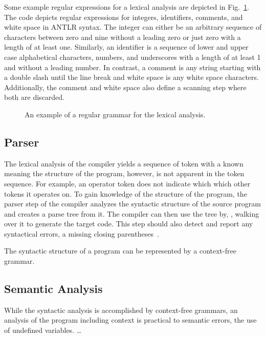 Some example regular expressions for a lexical analysis are depicted in Fig.~\ref{fig:example_lexer}. The code depicts regular expressions for integers, identifiers, comments, and white space in ANTLR syntax.
The integer can either be an arbitrary sequence of characters between zero and nine without a leading zero or just zero with a length of at least one. Similarly, an identifier is a sequence of lower and upper case alphabetical characters, numbers, and underscores with a length of at least 1 and without a leading number. In contrast, a comment is any string starting with a double slash until the line break and white space is any white space characters. Additionally, the comment and white space also define a scanning step where both are discarded.

\begin{figure}[htp]
    \centering
    
    \caption{An example of a regular grammar for the lexical analysis.}
    \label{fig:example_lexer}
\end{figure}

\subsection{Parser}
The lexical analysis of the compiler yields a sequence of token with a known meaning the structure of the program, however, is not apparent in the token sequence. For example, an operator token does not indicate which which other tokens it operates on. To gain knowledge of the structure of the program, the parser step of the compiler analyzes the syntactic structure of the source program and creates a parse tree from it. 
The compiler can then use the tree by, \eg, walking over it to generate the target code. This step should also detect and report any syntactical errors, \eg a missing closing parentheses~\cite{VSSD07}.

The syntactic structure of a program can be represented by a context-free grammar.

\subsection{Semantic Analysis}
While the syntactic analysis is accomplished by context-free grammars, an analysis of the program including context is practical to semantic errors, \eg the use of undefined variables. \dots

